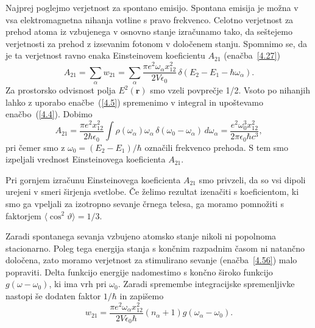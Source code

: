 Najprej poglejmo verjetnost za spontano emisijo. 
Spontana emisija je možna v vsa elektromagnetna nihanja votline s
pravo frekvenco. Celotno verjetnost za prehod atoma iz vzbujenega
v osnovno stanje izračunamo tako, da seštejemo verjetnosti za prehod z izsevanim fotonom 
v določenem stanju. Spomnimo se, da je ta verjetnost ravno enaka 
Einsteinovem koeficientu $A_{21}$ (enačba~\ref{4.27})
\begin{equation}
A_{21}=\sum_{\alpha}w_{21}=\sum_{\alpha}\frac{\pi 
e^{2}\omega_{\alpha}x_{12}^{2}}{2V\epsilon_{0}}\,\delta(E_{2}-E_{1}-\hbar\omega_{\alpha}).
\label{4.57}
\end{equation}
Za prostorsko odvisnost polja $E^{2}(\mathbf{r})$ smo vzeli povprečje
1/2. Vsoto po nihanjih lahko z uporabo enačbe~(\ref{4.5}) spremenimo v integral
in upoštevamo enačbo~(\ref{4.4}). Dobimo
\begin{equation}
A_{21}=\frac{\pi e^{2}x_{12}^{2}}{2\hbar\epsilon_{0}}\int\rho(\omega_{\alpha})\omega_\alpha\, 
\delta(\omega_{0}-\omega_{\alpha})\, d\omega_{\alpha}=\frac{e^{2}\omega_{0}^{3}x_{12}^{2}}{2\pi\epsilon_{0}\hbar c^{3}},
\label{4.58}
\end{equation}
 pri čemer smo z $\omega_{0}=(E_{2}-E_{1})/\hbar$ označili frekvenco prehoda. S tem smo 
 izpeljali vrednost Einsteinovega koeficienta $A_{21}$. 
\begin{remark}
Pri gornjem izračunu Einsteinovega koeficienta $A_{21}$ smo privzeli, da so vsi dipoli urejeni  
 v smeri širjenja svetlobe. Če želimo rezultat izenačiti s koeficientom, ki smo ga vpeljali
 za izotropno sevanje črnega telesa, ga moramo pomnožiti s faktorjem $\langle \cos^2\vartheta
 \rangle = 1/3$.
\end{remark}

Zaradi spontanega sevanja vzbujeno atomsko stanje nikoli ni popolnoma
stacionarno. Poleg tega energija stanja s končnim razpadnim časom ni natančno
določena, zato moramo verjetnost za stimulirano sevanje (enačba~\ref{4.56}) malo 
popraviti. Delta funkcijo energije nadomestimo s končno široko  
funkcijo $g(\omega-\omega_0)$, ki ima vrh pri $\omega_{0}$. Zaradi 
spremembe integracijske spremenljivke nastopi še dodaten faktor $1/\hbar$ in zapišemo
\begin{equation}
w_{21}=\frac{\pi e^{2}\omega_{\alpha}x_{12}^{2}}{2V\epsilon_{0}\hbar}
(n_{\alpha}+1)g(\omega_{\alpha}-\omega_0).
\label{4.59}
\end{equation}

